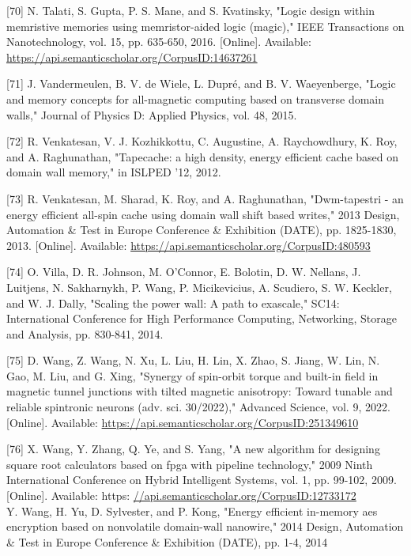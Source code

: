 \documentclass[10pt]{article}
\begin{document}
[70] N. Talati, S. Gupta, P. S. Mane, and S. Kvatinsky, "Logic design within memristive memories using memristor-aided logic (magic)," IEEE Transactions on Nanotechnology, vol. 15, pp. 635-650, 2016. [Online]. Available: \href{https://api.semanticscholar.org/CorpusID:14637261}{https://api.semanticscholar.org/CorpusID:14637261}

[71] J. Vandermeulen, B. V. de Wiele, L. Dupré, and B. V. Waeyenberge, "Logic and memory concepts for all-magnetic computing based on transverse domain walls," Journal of Physics D: Applied Physics, vol. 48, 2015.

[72] R. Venkatesan, V. J. Kozhikkottu, C. Augustine, A. Raychowdhury, K. Roy, and A. Raghunathan, "Tapecache: a high density, energy efficient cache based on domain wall memory," in ISLPED '12, 2012.

[73] R. Venkatesan, M. Sharad, K. Roy, and A. Raghunathan, "Dwm-tapestri - an energy efficient all-spin cache using domain wall shift based writes," 2013 Design, Automation \& Test in Europe Conference \& Exhibition (DATE), pp. 1825-1830, 2013. [Online]. Available: \href{https://api.semanticscholar.org/CorpusID:480593}{https://api.semanticscholar.org/CorpusID:480593}

[74] O. Villa, D. R. Johnson, M. O'Connor, E. Bolotin, D. W. Nellans, J. Luitjens, N. Sakharnykh, P. Wang, P. Micikevicius, A. Scudiero, S. W. Keckler, and W. J. Dally, "Scaling the power wall: A path to exascale," SC14: International Conference for High Performance Computing, Networking, Storage and Analysis, pp. 830-841, 2014.

[75] D. Wang, Z. Wang, N. Xu, L. Liu, H. Lin, X. Zhao, S. Jiang, W. Lin, N. Gao, M. Liu, and G. Xing, "Synergy of spin-orbit torque and built-in field in magnetic tunnel junctions with tilted magnetic anisotropy: Toward tunable and reliable spintronic neurons (adv. sci. 30/2022)," Advanced Science, vol. 9, 2022. [Online]. Available: \href{https://api.semanticscholar.org/CorpusID:251349610}{https://api.semanticscholar.org/CorpusID:251349610}

[76] X. Wang, Y. Zhang, Q. Ye, and S. Yang, "A new algorithm for designing square root calculators based on fpga with pipeline technology," 2009 Ninth International Conference on Hybrid Intelligent Systems, vol. 1, pp. 99-102, 2009. [Online]. Available: https: \href{//api.semanticscholar.org/CorpusID:12733172}{//api.semanticscholar.org/CorpusID:12733172}\\
[77] Y. Wang, H. Yu, D. Sylvester, and P. Kong, "Energy efficient in-memory aes encryption based on nonvolatile domain-wall nanowire," 2014 Design, Automation \& Test in Europe Conference \& Exhibition (DATE), pp. 1-4, 2014
\end{document}
